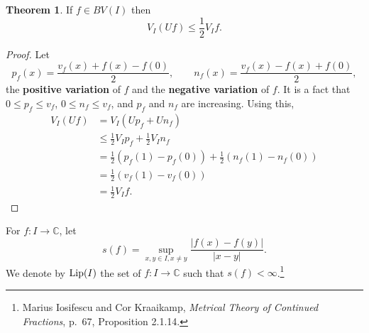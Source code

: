\documentclass{article}
\newcommand{\Lip}{\ensuremath\mathrm{Lip}}
\theoremstyle{definition}
\newtheorem{theorem}{Theorem}
\theoremstyle{definition}
\begin{document}
\begin{theorem}
If $f \in BV(I)$ then
\[
V_I (Uf) \leq \frac{1}{2} V_I f.
\]
\end{theorem}
\begin{proof}
Let 
\[
p_f(x) = \frac{v_f(x)+f(x)-f(0)}{2},\qquad n_f(x) = \frac{v_f(x)-f(x)+f(0)}{2},
\]
the \textbf{positive variation} of $f$ and the \textbf{negative variation} of $f$.
It is a fact that $0 \leq p_f \leq v_f$, $0 \leq n_f \leq v_f$, 
and $p_f$ and $n_f$ are increasing.
Using this,
\begin{align*}
V_I (Uf)&=V_I(Up_f+Un_f)\\
&\leq \frac{1}{2}V_I p_f + \frac{1}{2} V_I n_f\\
&=\frac{1}{2}(p_f(1)-p_f(0)) + \frac{1}{2}(n_f(1)-n_f(0))\\
&=\frac{1}{2}(v_f(1)-v_f(0))\\
&=\frac{1}{2}V_I f.
\end{align*}
\end{proof}


For $f:I \to \mathbb{C}$,  let
\[
s(f) = \sup_{x,y \in I, x \neq y} \frac{|f(x)-f(y)|}{|x-y|}.
\]
We denote by $\Lip(I)$ the set of $f:I \to \mathbb{C}$ such that $s(f)<\infty$.\footnote{Marius Iosifescu and Cor Kraaikamp,
{\em Metrical Theory of Continued Fractions}, p.~67, Proposition 2.1.14.}
\end{document}
